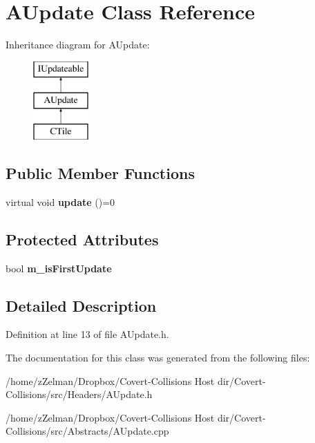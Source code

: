 \hypertarget{classAUpdate}{\section{A\-Update Class Reference}
\label{classAUpdate}
}
Inheritance diagram for A\-Update\-:\begin{figure}[H]
\begin{center}
\leavevmode
\includegraphics[height=3.000000cm]{classAUpdate}
\end{center}
\end{figure}
\subsection*{Public Member Functions}
\begin{DoxyCompactItemize}
\item 
\hypertarget{classAUpdate_a9f5be387e467fc5eea7fc45882abd949}{virtual void {\bfseries update} ()=0}\label{classAUpdate_a9f5be387e467fc5eea7fc45882abd949}

\end{DoxyCompactItemize}
\subsection*{Protected Attributes}
\begin{DoxyCompactItemize}
\item 
\hypertarget{classAUpdate_adf0a017c2fd5abd12f64f7f0fd992e66}{bool {\bfseries m\-\_\-is\-First\-Update}}\label{classAUpdate_adf0a017c2fd5abd12f64f7f0fd992e66}

\end{DoxyCompactItemize}


\subsection{Detailed Description}


Definition at line 13 of file A\-Update.\-h.



The documentation for this class was generated from the following files\-:\begin{DoxyCompactItemize}
\item 
/home/z\-Zelman/\-Dropbox/\-Covert-\/\-Collisions Host dir/\-Covert-\/\-Collisions/src/\-Headers/A\-Update.\-h\item 
/home/z\-Zelman/\-Dropbox/\-Covert-\/\-Collisions Host dir/\-Covert-\/\-Collisions/src/\-Abstracts/A\-Update.\-cpp\end{DoxyCompactItemize}
